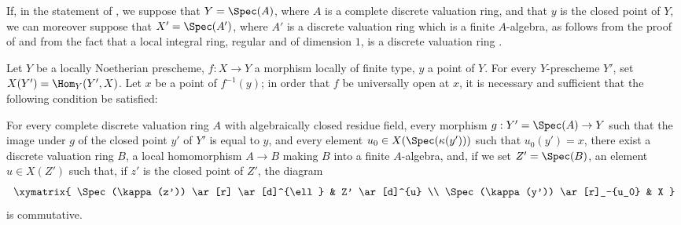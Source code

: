 \begin{remark}[14.5.7]
\label{IV.14.5.7}
If, in the statement of , we suppose that $Y=\Spec(A)$, where $A$ is a complete discrete valuation ring, and that $y$ is the closed point of $Y$, we can moreover suppose that $X'=\Spec(A')$, where $A'$ is a discrete valuation ring which is a finite $A$-algebra, as follows from the proof of  and from the fact that a local integral ring, regular and of dimension $1$, is a discrete valuation ring .
\end{remark}

\begin{proposition}[14.5.8]
\label{IV.14.5.8}
Let $Y$ be a locally Noetherian prescheme, $f:X\to Y$ a morphism locally of finite type, $y$ a point of $Y$.
For every $Y$-prescheme $Y'$, set $X(Y')=\Hom_Y(Y',X)$.
Let $x$ be a point of $f^{-1}(y)$; in order that $f$ be universally open at $x$, it is necessary and sufficient that the following condition be satisfied:

For every complete discrete valuation ring $A$ with algebraically closed residue field, every morphism $g:Y'=\Spec(A)\to Y$ such that the image under $g$ of the closed point $y'$ of $Y'$ is equal to $y$, and every element $u_0\in X(\Spec(\kappa(y')))$ such that $u_0(y')=x$, there exist a discrete valuation ring $B$, a local homomorphism $A\to B$ making $B$ into a finite $A$-algebra, and, if we set $Z'=\Spec(B)$, an element $u\in X(Z')$ such that, if $z'$ is the closed point of $Z'$, the diagram
\[
  \xymatrix{
    \Spec(\kappa(z')) \ar[r] \ar[d]^{\ell} & Z' \ar[d]^{u} \\
    \Spec(\kappa(y')) \ar[r]_-{u_0} & X
  }
\]
is commutative.
\end{proposition}

